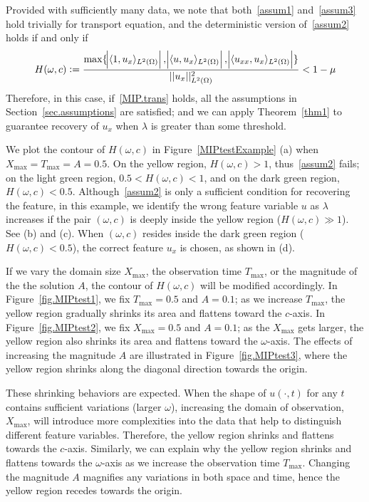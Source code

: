 \documentclass[a4paper,11pt]{article}
\begin{document}
Provided with sufficiently many data, we note that both~\eqref{assum1} and~\eqref{assum3} hold trivially for transport equation, and the deterministic version of~\eqref{assum2}  holds if and only if
\begin{align}
H(\omega,c):=\frac{\max\{\abs{\langle 1,u_x\rangle_{L^2(\Omega)}},\abs{\langle u,u_x\rangle_{L^2(\Omega)}},\abs{\langle u_{xx},u_x\rangle_{L^2(\Omega)}}\}}{||u_x||^2_{L^2(\Omega)}}<1-\mu	\label{MIP.trans}
\end{align}
Therefore,  in this case, if~\eqref{MIP.trans} holds, all the assumptions in Section~\ref{sec.assumptions} are satisfied; and we can apply Theorem~\ref{thm1} to guarantee recovery of $u_x$ when $\lambda$ is greater than some threshold. 

We plot the contour of $H(\omega,c)$ in Figure~\ref{MIPtestExample} (a) when $X_{\max}=T_{\max}=A=0.5$. On the yellow region, $H(\omega,c)>1$, thus~\eqref{assum2} fails; on the light green region,  $0.5<H(\omega,c)<1$, and on the dark green region, $H(\omega,c)<0.5$.  Although~\eqref{assum2} is only a sufficient condition for recovering the feature, in this example, we identify the wrong feature variable $u$ as $\lambda$ increases if the pair $(\omega,c)$ is deeply inside the yellow region ($H(\omega,c)\gg 1$). See (b) and (c). When $(\omega,c)$ resides inside the dark green region ($H(\omega,c)<0.5$), the correct feature $u_x$ is chosen, as shown in (d). 


If we vary the domain size $X_{\max}$, the observation time $T_{\max}$, or the magnitude of the the solution $A$, the contour of $H(\omega,c)$ will be modified accordingly. In Figure~\ref{fig.MIPtest1}, we fix $T_{\max}=0.5$ and $A=0.1$; as we increase $T_{\max}$, the yellow region gradually shrinks its area and flattens toward the $c$-axis. In Figure~\ref{fig.MIPtest2}, we fix $X_{\max}=0.5$ and $A=0.1$; as the $X_{\max}$ gets larger, the yellow region also shrinks its area and flattens toward the $\omega$-axis. The effects of increasing the magnitude $A$ are illustrated in Figure~\ref{fig.MIPtest3}, where the yellow region shrinks along the diagonal direction towards the origin.

These shrinking behaviors are expected. When the shape of $u(\cdot,t)$ for any $t$ contains sufficient variations (larger $\omega$), increasing the domain of observation, $X_{\max}$, will introduce more complexities into the data that help to distinguish different feature variables. Therefore, the yellow region shrinks and flattens towards the $c$-axis. Similarly, we can explain why the yellow region shrinks and flattens towards the $\omega$-axis as we increase the observation time $T_{\max}$. Changing the magnitude $A$ magnifies any variations in both space and time, hence the yellow region recedes towards the origin.
\end{document}
